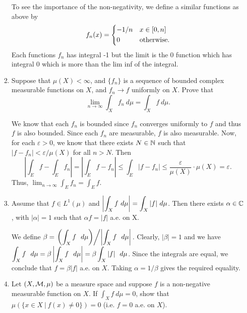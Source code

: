 \documentclass[12pt]{article}
\begin{document}
\begin{enumerate}
\begin{mybox}
        \vspace*{2mm}
        To see the importance of the non-negativity, we define a similar
        functions as above by
        $$f_n(x)=
        \begin{dcases}
            -1/n &x\in [0,n]\\
            0 &\text{otherwise.}
        \end{dcases}$$
        Each functions $f_n$ has integral -1 but the limit is the 0 function
        which has integral 0 which is more than the lim inf of the integral.
    \end{mybox}
    
    
    \item Suppose that $\mu(X)  < \infty$, and $\{f_n\}$ is a sequence of bounded complex measurable functions on $X$, and $f_n \to f$ uniformly on $X$. Prove that 
    $$\lim_{n \to \infty} \int_X f_n \ d\mu = \int_X f \ d\mu.$$
    
    \begin{mybox}
        We know that each $f_n$ is bounded since $f_n$ converges uniformly to
        $f$ and thus $f$ is also bounded. Since each $f_n$ are measurable, $f$
        is also measurable. Now, for each $\varepsilon>0$, we know that
        there exists $N\in\mathbb{N}$ such that $|f-f_n|<\varepsilon/\mu(X)$
        for all $n>N$. Then
        $$\left|\int_{E}{f}-\int_E{f_n}\right|=\left|\int_E{f-f_n}\right|
        \leq\int_E{|f-f_n|}\leq \frac{\varepsilon}{\mu(X)}\cdot\mu(X)=
        \varepsilon.$$
        Thus, $\lim_{n\to\infty}\int_E{f_n}=\int_E{f}$.
    \end{mybox}
    
    
    \item Assume that $f \in L^1(\mu)$ and 
    $\displaystyle \left| \int_X f \ d\mu \right| = \int_X |f| \ d\mu$. 
    Then there exists $\alpha \in \mathbb{C}$, with $|\alpha| = 1$ such that $\alpha f = |f|$ a.e. 
    on X. 
    \begin{mybox}
        We define $\ds\beta=\left.\left(\int_X{f\ \dmu}\right)\middle/
        \left|\int_X{f\ \dmu}\right|\right.$. Clearly, $|\beta|=1$ and we
        have $\ds\int_X{f\ \dmu}=\beta\left|\int_X{f\ \dmu}\right|=
        \beta\int_X{|f|\ \dmu}$. Since the integrals are equal, we conclude
        that $f=\beta|f|$ a.e. on $X$. Taking $\alpha=1/\beta$ gives the
        required equality.
    \end{mybox}

    \item Let $(X, \mathcal{M}, \mu)$ be a measure space and suppose $f$ is a non-negative measurable function on $X$. If $\int_X f\ d\mu = 0$, show that $\mu(\{x \in X \ | \ f(x) \neq 0 \}) = 0$ (i.e. $f=0$ a.e. on $X$).
    

\end{enumerate}
\end{document}
